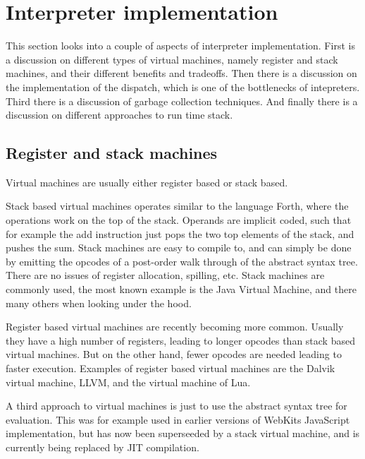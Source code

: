 \section{Interpreter implementation}
This section looks into a couple of aspects of interpreter implementation.
First is a discussion on different types of virtual machines, namely register and stack machines, and their different benefits and tradeoffs.
Then there is a discussion on the implementation of the dispatch, which is one of the bottlenecks of intepreters.
Third there is a discussion of garbage collection techniques.
And finally there is a discussion on different approaches to run time stack.

\subsection{Register and stack machines}
Virtual machines are usually either register based or stack based.

Stack based virtual machines operates similar to the language Forth, where the operations work on the top of the stack. 
Operands are implicit coded, such that for example the add instruction just pops the two top elements of the stack, and pushes the sum. 
Stack machines are easy to compile to, 
and can simply be done by emitting the opcodes of a post-order walk through of the abstract syntax tree. 
There are no issues of register allocation, spilling, etc.
Stack machines are commonly used, the most known example is the Java Virtual Machine, and there many others when looking under the hood.

Register based virtual machines are recently becoming more common. 
Usually they have a high number of registers, leading to longer opcodes than stack based virtual machines. But on the other hand, fewer opcodes are needed leading to faster execution\cite{register-vs-stack}. 
Examples of register based virtual machines are the Dalvik\cite{dalvik} virtual machine, LLVM\cite{llvm}, and the virtual machine of Lua\cite{luavm}.

A third approach to virtual machines is just to use the abstract syntax tree for evaluation. This was for example used in earlier versions of WebKits JavaScript implementation, but has now been superseeded by a stack virtual machine, and is currently being replaced by JIT compilation.

